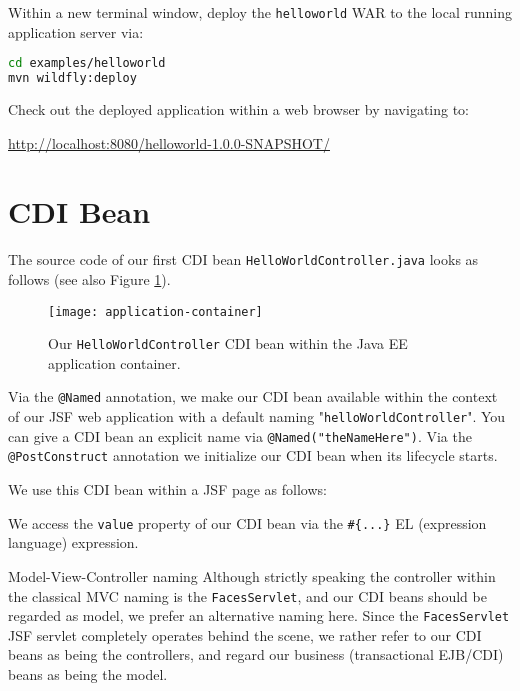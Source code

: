 Within a new terminal window, deploy the \texttt{helloworld} WAR to the local running application server via:
\begin{lstlisting}[language=bash]
cd examples/helloworld
mvn wildfly:deploy
\end{lstlisting}

Check out the deployed application within a web browser by navigating to:

\url{http://localhost:8080/helloworld-1.0.0-SNAPSHOT/}

\section{CDI Bean}

The source code of our first CDI \cite{CDI2} bean \texttt{HelloWorldController.java} looks as follows (see also Figure \ref{fig:application-container}).
\begin{figure}[htbp]
	\begin{center}
		\texttt{[image: application-container]}
		\caption{Our \texttt{HelloWorldController} CDI bean within the Java EE application container.}
		\label{fig:application-container}
	\end{center}
\end{figure}

Via the \texttt{@Named} annotation, we make our CDI bean available within the context of our JSF web application with a default naming "\texttt{helloWorldController}".
You can give a CDI bean an explicit name via \texttt{@Named("theNameHere")}.
Via the \texttt{@PostConstruct} annotation we initialize our CDI bean when its lifecycle starts.

We use this CDI bean within a JSF page as follows:

We access the \texttt{value} property of our CDI bean via the \texttt{\#\{...\}} EL (expression language) expression.

\begin{TIP}{Model-View-Controller naming}
	Although strictly speaking the controller within the classical MVC naming is the \texttt{FacesServlet}, and our CDI beans should be regarded as model,
	we prefer an alternative naming here.
	Since the \texttt{FacesServlet} JSF servlet completely operates behind the scene, we rather refer to our CDI beans as being the controllers,
	and regard our business (transactional EJB/CDI) beans as being the model.
\end{TIP}

